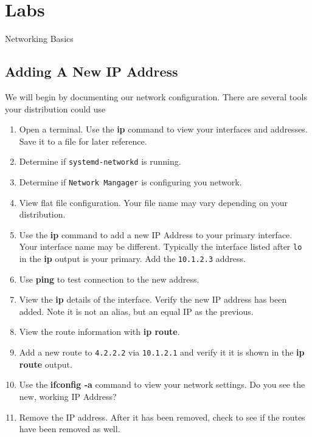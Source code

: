 \clearpage\section{Labs}\begin{Lab}

\begin{exe} {Networking Basics}

	\subsection*{Adding A New IP Address}
   We will begin by documenting our network configuration. 
	There are several tools your distribution could use

      \begin{enumerate}
         \item
		 Open a terminal. Use the \textbf{ip} command
		      to view your interfaces and addresses.
		      Save it to a file for later reference.

         \item
		 Determine if \verb:systemd-networkd: is running.

	 \item
		 Determine if \verb:Network Mangager: is 
		      configuring you network.
	      \item
		      View flat file configuration. Your file 
		      name may vary depending on your distribution.

         \item
		 Use the \textbf{ip} command to add a new IP 
		      Address to your primary interface. Your
		      interface name may be different. Typically
		      the interface listed after \verb:lo: in the
		      \textbf{ip} output is your primary. Add the
		      \verb:10.1.2.3: address.

	      \item
		      Use \textbf{ping} to test connection to the
		      new address.
	      \item
		      View the \textbf{ip} details of the interface.
		      Verify the new IP address has been added. Note
		      it is not an alias, but an equal IP as the previous.

	      \item
		      View the route information with \textbf{ip route}.
		      
	      \item
		      Add a new route to \verb:4.2.2.2: via \verb:10.1.2.1:
		      and verify it it is shown in the \textbf{ip route}
		      output.
	      \item
		      Use the \textbf{ifconfig -a} command to view
		      your network settings.  Do you see the new,
		      working IP Address?
	      \item
		      Remove the IP address. After it has been removed, 
		      check to see if the routes have been removed as 
		      well.


\end{enumerate}
\end{exe}
\end{Lab}

